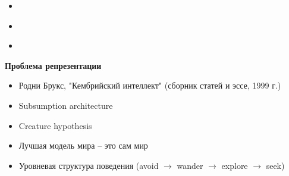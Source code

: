 \documentclass{beamer}
\begin{document}
\begin{frame}{}
\begin{itemize}
	\item 
	\medskip
\end{itemize}
\end{frame}

\begin{frame}{}
\begin{itemize}
	\item 
	\medskip
\end{itemize}
\end{frame}

\begin{frame}{}
\begin{itemize}
	\item 
	\medskip
\end{itemize}
\end{frame}


%
%

\begin{frame}{}
\begin{center}
	\textbf{Проблема репрезентации}
\end{center}
\end{frame}

\begin{frame}{}
\begin{itemize}
	\item Родни Брукс, "Кембрийский интеллект" (сборник статей и эссе, 1999 г.)
	\medskip
	\item Subsumption architecture
	\medskip
	\item Creature hypothesis
\end{itemize}
\end{frame}

\begin{frame}{}
\begin{itemize}
	\item Лучшая модель мира -- это сам мир
	\medskip
\end{itemize}
\end{frame}

\begin{frame}{}
\begin{itemize}
	\item Уровневая структура поведения (avoid $\to$ wander $\to$ explore $\to$ seek)
	\medskip
\end{itemize}
\end{frame}
\end{document}
